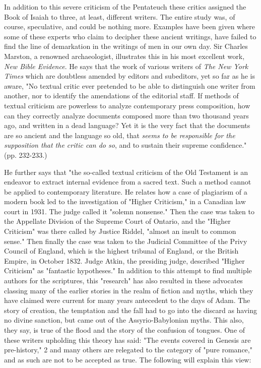 In addition to this severe criticism of the Pentateuch these critics assigned the Book of Isaiah
to three, at least, different writers. The entire study was, of course, speculative, and could be
nothing more. Examples have been given where some of these experts who claim to decipher
these ancient writings, have failed to find the line of demarkation in the writings of men in
our own day. Sir Charles Marston, a renowned archaeologist, illustrates this in his most
excellent work, \textit{New Bible Evidence}. He says that the work of various writers of \textit{The New
York Times} which are doubtless amended by editors and subeditors, yet so far as he is aware,
"No textual critic ever pretended to be able to distinguish one writer from another, nor to
identify the amendations of the editorial staff. If methods of textual criticism are powerless to
analyze contemporary press composition, how can they correctly analyze documents
composed more than two thousand years ago, and written in a dead language? Yet it is the
very fact that the documents are so ancient and the language so old, that \textit{seems to be
responsible for the supposition that the critic can do so}, and to sustain their supreme
confidence." (pp. 232-233.)

He further says that "the so-called textual criticism of the Old Testament is an endeavor to
extract internal evidence from a sacred text. Such a method cannot be applied to
contemporary literature. He relates how a case of plagiarism of a modern book led to the
investigation of "Higher Criticism," in a Canadian law court in 1931. The judge called it
"solemn nonsense." Then the case was taken to the Appellate Division of the Supreme Court
of Ontario, and the "Higher Criticism" was there called by Justice Riddel, "almost an insult to
common sense." Then finally the case was taken to the Judicial Committee of the Privy
Council of England, which is the highest tribunal of England, or the British Empire, in
October 1832. Judge Atkin, the presiding judge, described "Higher Criticism" as "fantastic
hypotheses." In addition to this attempt to find multiple authors for the scriptures, this
"research" has also resulted in these advocates classing many of the earlier stories in the
realm of fiction and myths, which they have claimed were current for many years antecedent
to the days of Adam. The story of creation, the temptation and the fall had to go into the
discard as having no divine sanction, but came out of the Assyrio-Babylonian myths. This
also, they say, is true of the flood and the story of the confusion of tongues. One of these
writers upholding this theory has said: "The events covered in Genesis are pre-history," 2 and
many others are relegated to the category of "pure romance," and as such are not to be
accepted as true. The following will explain this view:

